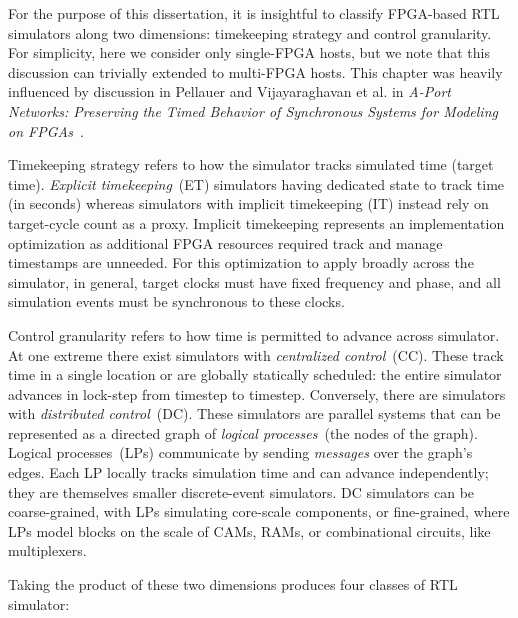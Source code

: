 
For the purpose of this dissertation, it is insightful to classify FPGA-based
RTL simulators along two dimensions: timekeeping strategy and control
granularity. For simplicity, here we consider only single-FPGA hosts, but we
note that this discussion can trivially extended to multi-FPGA hosts. This
chapter was heavily influenced by discussion in Pellauer and Vijayaraghavan et
al. in \emph{A-Port Networks: Preserving the Timed Behavior of Synchronous
Systems for Modeling on FPGAs}~\cite{APortNetworks}.

Timekeeping strategy refers to how the simulator tracks simulated time (target time). \emph{Explicit timekeeping}~(ET)
simulators having dedicated state to track time (in seconds) whereas simulators with implicit
timekeeping (IT) instead rely on target-cycle count as a proxy. Implicit timekeeping represents an
implementation optimization as additional FPGA resources required track and
manage timestamps are unneeded. For this optimization to apply broadly across
the simulator, in general, target clocks must have fixed frequency and phase, and
all simulation events must be synchronous to these clocks.

Control granularity refers to how time is permitted to advance across simulator. At one extreme there exist
simulators with \emph{centralized control}~(CC). These track time in
a single location or are globally statically scheduled: the entire simulator advances in lock-step from
timestep to timestep.  Conversely, there are simulators with \emph{distributed
control}~(DC). These simulators are parallel systems that can be represented as a directed graph of \emph{logical
processes}~(the nodes of the graph). Logical processes~(LPs) communicate by sending \emph{messages} over the graph's edges.
Each LP locally tracks simulation time and can advance independently; they are themselves smaller discrete-event simulators. DC
simulators can be coarse-grained, with LPs simulating core-scale components, or
fine-grained, where LPs model blocks on the scale of CAMs, RAMs, or
combinational circuits, like multiplexers.

Taking the product of these two dimensions produces four classes of RTL simulator:

